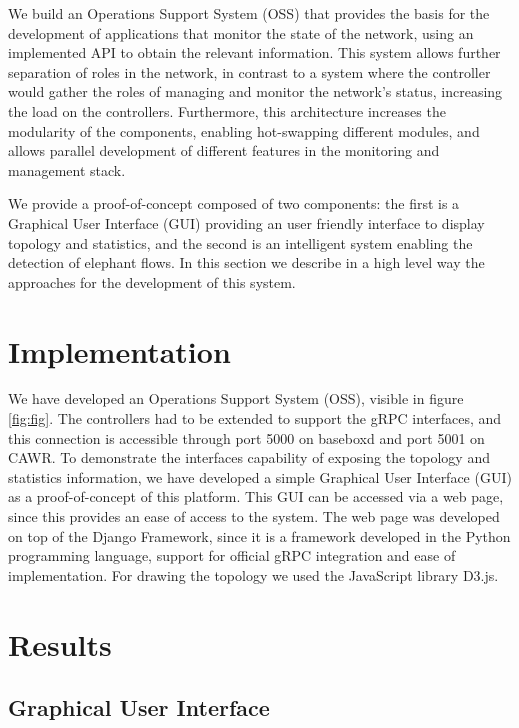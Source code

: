 \documentclass[a4paper]{IEEEtran}
\begin{document}
\par We build an Operations Support System (OSS) that provides the basis for the development of applications that monitor the state of the network, using an
implemented API to obtain the relevant information. This system allows further separation of roles in the network, in contrast to a system where the controller would
gather the roles of managing and monitor the network’s status, increasing the load on the controllers. Furthermore, this architecture increases the modularity of 
the components, enabling hot-swapping different modules, and allows parallel development of different features in the monitoring and management stack.

We provide a proof-of-concept composed of two components: the first is a Graphical User Interface (GUI) providing an user friendly interface to display topology and
statistics, and the second is an intelligent system enabling the detection of elephant flows. In this section we describe in a high level way the approaches for the 
development of this system.

\section{Implementation}

We have developed an Operations Support System (OSS), visible in figure \ref{fig:fig}. The controllers had to be extended to support the gRPC interfaces, and this 
connection is accessible through port 5000 on baseboxd and port 5001 on CAWR.  To demonstrate the interfaces capability of exposing the topology and statistics 
information, we have developed a simple Graphical User Interface (GUI) as a proof-of-concept of this platform. This GUI can be accessed via a web page, since this
provides an ease of access to the system. The web page was developed on top of the Django Framework, since it is a framework developed in the Python programming 
language, support for official gRPC integration and ease of implementation. For drawing the topology we used the JavaScript library D3.js.

\section{Results}

\subsection{Graphical User Interface}
\end{document}
